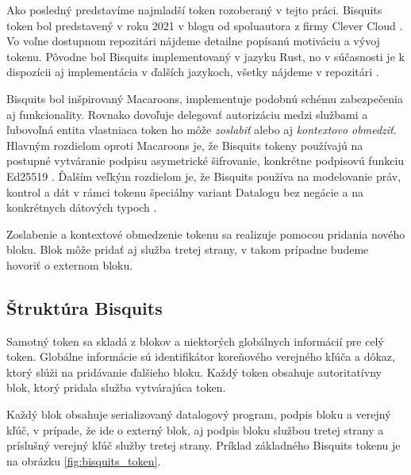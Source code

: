 Ako posledný predstavíme najmladší token rozoberaný v tejto práci. Bisquits token bol predstavený v roku 2021 v blogu od spoluautora z firmy Clever Cloud \cite{biscuits_blog}. Vo voľne dostupnom repozitári \cite{biscuits_git} nájdeme detailne popísanú motiváciu a vývoj tokenu. Pôvodne bol Bisquits implementovaný v jazyku Rust, no v súčasnosti je k dispozícii aj implementácia v ďalších jazykoch, všetky nájdeme v repozitári \cite{biscuits_git}.

Bisquits bol inšpirovaný Macaroons, implementuje podobnú schému zabezpečenia aj funkcionality. Rovnako dovoľuje delegovať autorizáciu medzi službami a ľubovoľná entita vlastniaca token ho môže \textit{zoslabiť} alebo aj \textit{kontextovo obmedziť}. Hlavným rozdielom oproti Macaroons je, že Bisquits tokeny používajú na postupné vytváranie podpisu asymetrické šifrovanie, konkrétne podpisovú funkciu Ed25519 \cite{ed_rfc}. Ďalším veľkým rozdielom je, že Bisquits používa na modelovanie práv, kontrol a dát v rámci tokenu špeciálny variant Datalogu bez negácie a na konkrétnych dátových typoch \cite{datalog_bis}.

Zoslabenie a kontextové obmedzenie tokenu sa realizuje pomocou pridania nového bloku. Blok môže pridať aj služba tretej strany, v takom prípadne budeme hovoriť o externom bloku.

\subsection{Štruktúra Bisquits}

Samotný token sa skladá z blokov a niektorých globálnych informácií pre celý token. Globálne informácie sú identifikátor koreňového verejného kľúča a dôkaz, ktorý slúži na pridávanie ďalšieho bloku. Každý token obsahuje autoritatívny blok, ktorý pridala služba vytvárajúca token.

Každý blok obsahuje serializovaný datalogový program, podpis bloku a verejný kľúč, v prípade, že ide o externý blok, aj podpis bloku službou tretej strany a príslušný verejný kľúč služby tretej strany. Príklad základného Bisquits tokenu je na obrázku \ref{fig:bisquits_token}.

